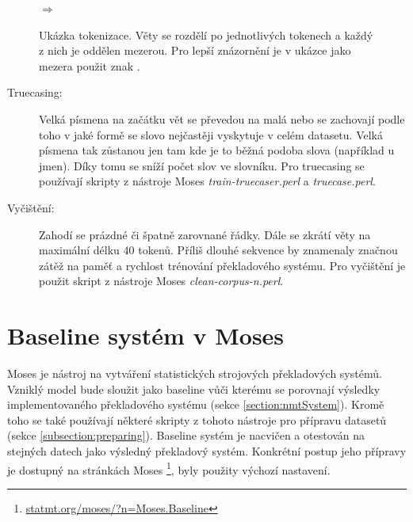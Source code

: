 \begin{figure}[H]
    \begin{center}
     \setlength{\fboxsep}{8pt}
        $\Longrightarrow$
        \setlength{\fboxsep}{8pt}
    \end{center}
	\caption{Ukázka tokenizace. Věty se rozdělí po jednotlivých tokenech a každý z nich je oddělen mezerou. Pro lepší znázornění je v ukázce jako mezera použit znak \uv{\textvisiblespace}.}
	\label{img:tokenization}
\end{figure}


\begin{description}
  \item[Truecasing:] Velká písmena na začátku vět se převedou na malá nebo se zachovají podle toho v jaké formě se slovo nejčastěji vyskytuje v celém datasetu. Velká písmena tak zůstanou jen tam kde je to běžná podoba slova (například u jmen). Díky tomu se sníží počet slov ve slovníku. Pro truecasing se používají skripty z nástroje Moses \emph{train-truecaser.perl} a \emph{truecase.perl}.
\end{description}

\begin{description}
  \item[Vyčištění:] Zahodí se prázdné či špatně zarovnané řádky. Dále se zkrátí věty na maximální délku 40 tokenů. Příliš dlouhé sekvence by znamenaly značnou zátěž na paměť a rychlost trénování překladového systému. Pro vyčištění je použit skript z nástroje Moses \emph{clean-corpus-n.perl}.
\end{description}


\section{Baseline systém v Moses}\label{section:baseline}
Moses \cite{moses} je nástroj na vytváření statistických strojových překladových systémů. Vzniklý model bude sloužit jako baseline vůči kterému se porovnají výsledky implementovaného překladového systému (sekce \ref{section:nmtSystem}). Kromě toho se také používají některé skripty z tohoto nástroje pro přípravu datasetů (sekce \ref{subsection:preparing}). Baseline systém je nacvičen a otestován na stejných datech jako výsledný překladový systém. Konkrétní postup jeho přípravy je dostupný na stránkách Moses \footnote{\url{statmt.org/moses/?n=Moses.Baseline}}, byly použity výchozí nastavení.


